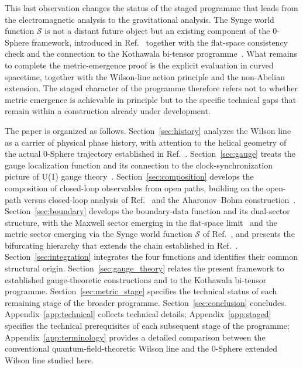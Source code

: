 \documentclass[%
 reprint, amsmath,amssymb, aps, prb, ]{revtex4-2}
\numberwithin{equation}{section}
\begin{document}
This last observation changes the status of the staged programme that leads from the electromagnetic analysis to the gravitational analysis. The Synge world function $\mathcal{S}$ is not a distant future object but an existing component of the 0-Sphere framework, introduced in Ref.~\cite{hanamura51} together with the flat-space consistency check and the connection to the Kothawala bi-tensor programme~\cite{Kothawala2023}. What remains to complete the metric-emergence proof is the explicit evaluation in curved spacetime, together with the Wilson-line action principle and the non-Abelian extension. The staged character of the programme therefore refers not to whether metric emergence is achievable in principle but to the specific technical gaps that remain within a construction already under development.

The paper is organized as follows. Section~\ref{sec:history} analyzes the Wilson line as a carrier of physical phase history, with attention to the helical geometry of the actual 0-Sphere trajectory established in Ref.~\cite{hanamura51}. Section~\ref{sec:gauge} treats the gauge localization function and its connection to the clock-synchronization picture of U(1) gauge theory~\cite{hanamura17, WuYang1975}. Section~\ref{sec:composition} develops the composition of closed-loop observables from open paths, building on the open-path versus closed-loop analysis of Ref.~\cite{hanamura43} and the Aharonov--Bohm construction~\cite{Aharonov1959, Tonomura1986}. Section~\ref{sec:boundary} develops the boundary-data function and its dual-sector structure, with the Maxwell sector emerging in the flat-space limit~\cite{hanamura54} and the metric sector emerging via the Synge world function $\mathcal{S}$ of Ref.~\cite{hanamura51}, and presents the bifurcating hierarchy that extends the chain established in Ref.~\cite{hanamura54}. Section~\ref{sec:integration} integrates the four functions and identifies their common structural origin. Section~\ref{sec:gauge_theory} relates the present framework to established gauge-theoretic constructions and to the Kothawala bi-tensor programme. Section~\ref{sec:metric_stage} specifies the technical status of each remaining stage of the broader programme. Section~\ref{sec:conclusion} concludes. Appendix~\ref{app:technical} collects technical details; Appendix~\ref{app:staged} specifies the technical prerequisites of each subsequent stage of the programme; Appendix~\ref{app:terminology} provides a detailed comparison between the conventional quantum-field-theoretic Wilson line and the 0-Sphere extended Wilson line studied here.
\end{document}
